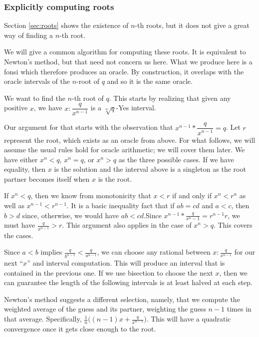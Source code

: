 \documentclass[12pt]{article}
\theoremstyle{remark}
\begin{document}
\subsubsection{Explicitly computing roots}

Section \ref{sec:roots} shows the existence of $n$-th roots, but it does not give a great way of finding a $n$-th root. 

We will give a common algorithm for computing these roots. It is equivalent to Newton's method, but that need not concern us here. What we produce here is a fonsi which therefore produces an oracle. By construction, it overlaps with the oracle intervals of the $n$-root of $q$ and so it is the same oracle. 

We want to find the $n$-th root of $q$. This starts by realizing that given any positive $x$, we have $x:\dfrac{q}{x^{n-1}}$ is a $\sqrt[n]{q}$-Yes interval. 

Our argument for that starts with the observation that $x^{n-1}*\dfrac{q}{x^{n-1}} = q$. Let $r$ represent the root, which exists as an oracle from above. For what follows, we will assume the usual rules hold for oracle arithmetic; we will cover them later. We have either $x^n < q$, $x^n = q$, or $x^n > q$ as the three possible cases. If we have equality, then $x$ is the solution and the interval above is a singleton as the root partner becomes itself when $x$ is the root. 

If $x^n < q$, then we know from monotonicity that $x < r$ if and only if $x^n < r^n$ as well as $x^{n-1} < r^{n-1}$. It is a basic inequality fact that if $ab = cd$ and $a < c $, then $b > d$ since, otherwise, we would have $ab < cd$.Since $x^{n-1} * \frac{q}{x^n-1} = r^{n-1} r$, we must have $\frac{q}{x^{n-1}} > r$. This argument also applies in the case of $x^n > q$. This covers the cases. 

Since $a<b$ implies $\frac{q}{b^{n-1}} < \frac{q}{a^{n-1}}$, we can choose any rational between $x:\frac{q}{x^{n-1}}$ for our next ``$x$'' and interval computation. This will produce an interval that is contained in the previous one. If we use bisection to choose the next $x$, then we can guarantee the length of the following intervals is at least halved at each step. 

Newton's method suggests a different selection, namely, that we compute the weighted average of the guess and its partner, weighting the guess $n-1$ times in that average. Specifically, $\frac{1}{n} \big( (n-1) x + \frac{q}{x^{n-1}} \big)$. This will have a quadratic convergence once it gets close enough to the root.
\end{document}
